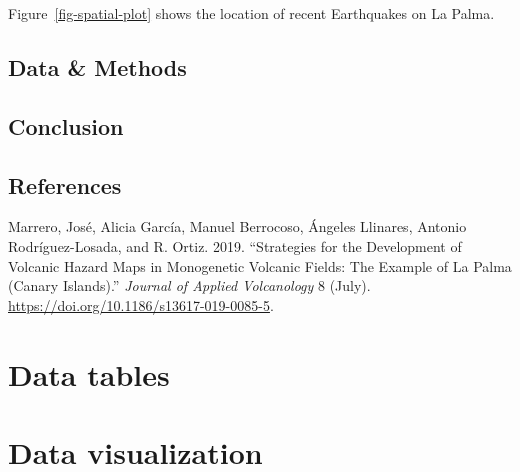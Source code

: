 \documentclass[
  letterpaper,
  DIV=11,
  numbers=noendperiod]{scrreprt}
\newlength{\cslhangindent}
\newenvironment{CSLReferences}[2] %
 {\begin{list}{}{%
  \setlength{\itemindent}{0pt}
  \setlength{\leftmargin}{0pt}
  \setlength{\parsep}{0pt}
  \ifodd #1
   \setlength{\leftmargin}{\cslhangindent}
   \setlength{\itemindent}{-1\cslhangindent}
  \fi
  \setlength{\itemsep}{#2\baselineskip}}}
 {\end{list}}
\begin{document}
Figure~\ref{fig-spatial-plot} shows the location of recent Earthquakes
on La Palma.

\section{Data \& Methods}\label{sec-data-methods}

\section{Conclusion}\label{conclusion}

\section*{References}\label{references}


\label{refs}
\begin{CSLReferences}{1}{0}
Marrero, José, Alicia García, Manuel Berrocoso, Ángeles Llinares,
Antonio Rodríguez-Losada, and R. Ortiz. 2019. {``Strategies for the
Development of Volcanic Hazard Maps in Monogenetic Volcanic Fields: The
Example of {La} {Palma} ({Canary} {Islands}).''} \emph{Journal of
Applied Volcanology} 8 (July).
\url{https://doi.org/10.1186/s13617-019-0085-5}.

\end{CSLReferences}


\chapter{Data tables}\label{data-tables}


\chapter{Data visualization}\label{data-visualization}
\end{document}
